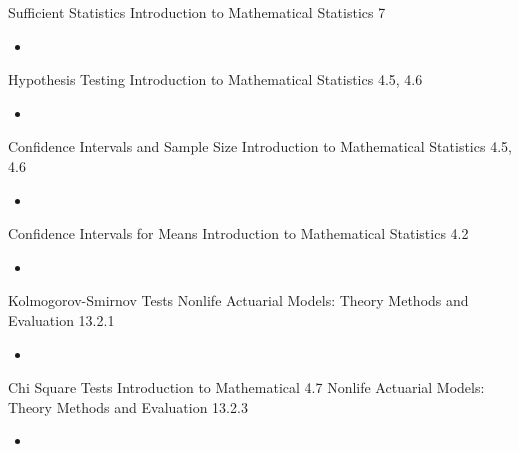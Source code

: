 \documentclass[12pt, titlepage, french]{report}
\begin{document}
\begin{CHPT_SUMM_AUTO_NUMB}[label = {L.-32}]{Sufficient Statistics}
Introduction to Mathematical Statistics 7
	\begin{itemize}
		\item	
	\end{itemize}
\end{CHPT_SUMM_AUTO_NUMB}

\begin{CHPT_SUMM_AUTO_NUMB}[label = {L.-33}]{Hypothesis Testing}
Introduction to Mathematical Statistics 4.5, 4.6
	\begin{itemize}
		\item	
	\end{itemize}
\end{CHPT_SUMM_AUTO_NUMB}

\begin{CHPT_SUMM_AUTO_NUMB}[label = {L.-34}]{Confidence Intervals and Sample Size}
Introduction to Mathematical Statistics 4.5, 4.6
	\begin{itemize}
		\item	
	\end{itemize}
\end{CHPT_SUMM_AUTO_NUMB}

\begin{CHPT_SUMM_AUTO_NUMB}[label = {L.-35}]{Confidence Intervals for Means}
Introduction to Mathematical Statistics 4.2
	\begin{itemize}
		\item	
	\end{itemize}
\end{CHPT_SUMM_AUTO_NUMB}

\begin{CHPT_SUMM_AUTO_NUMB}[label = {L.-36}]{Kolmogorov-Smirnov Tests}
Nonlife Actuarial Models: Theory Methods and Evaluation 13.2.1
	\begin{itemize}
		\item	
	\end{itemize}
\end{CHPT_SUMM_AUTO_NUMB}

\begin{CHPT_SUMM_AUTO_NUMB}[label = {L.-37}]{Chi Square Tests}
Introduction to Mathematical 4.7
Nonlife Actuarial Models: Theory Methods and Evaluation 13.2.3
	\begin{itemize}
		\item	
	\end{itemize}
\end{CHPT_SUMM_AUTO_NUMB}
\end{document}

